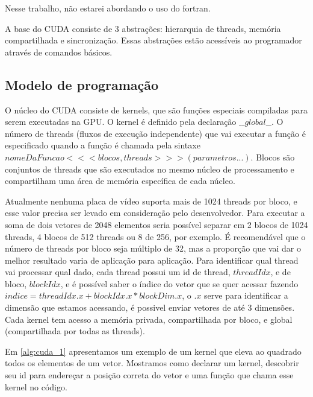 Nesse trabalho, não estarei abordando o uso do fortran.

A base do CUDA consiste de 3 abstrações: hierarquia de threads, memória compartilhada e sincronização. Essas abstrações estão acessíveis ao programador através de comandos básicos. 


\subsection{Modelo de programação}
O núcleo do CUDA consiste de kernels, 
que são funções especiais compiladas para serem executadas na GPU. O kernel é definido pela declaração $\_\_global\_\_$. O número de threads (fluxos de execução independente) %
que vai executar a função é especificado quando a função é chamada pela sintaxe $nomeDaFuncao<<<blocos, threads>>>(parametros...)$. Blocos são conjuntos de threads que são executados no mesmo núcleo de processamento e compartilham uma área de memória específica de cada núcleo. 

Atualmente nenhuma placa de vídeo suporta mais de 1024 threads por bloco, e esse valor precisa ser levado em consideração pelo desenvolvedor. Para executar a soma de dois vetores de 2048 elementos seria possível separar em 2 blocos de 1024 threads, 4 blocos de 512 threads ou 8 de 256, por exemplo. É recomendável que o número de threads por bloco seja múltiplo de 32, mas a proporção que vai dar o melhor resultado varia de aplicação para aplicação.
Para identificar qual thread vai processar qual dado, cada thread possui um id de thread, $threadIdx$, e de bloco, $blockIdx$, e é possível saber o índice do vetor que se quer acessar fazendo $indice = threadIdx.x + blockIdx.x * blockDim.x$, o $.x$ serve para identificar a dimensão que estamos acessando, é possivel enviar vetores de até 3 dimensões.
Cada kernel tem acesso a memória privada, compartilhada por bloco,  e global (compartilhada por todas as threads).

Em \ref{alg:cuda_1} apresentamos um exemplo de um kernel que eleva ao quadrado todos os elementos de um vetor. Mostramos como declarar um kernel, descobrir seu id para endereçar a posição correta do vetor e uma função que chama esse kernel no código.

